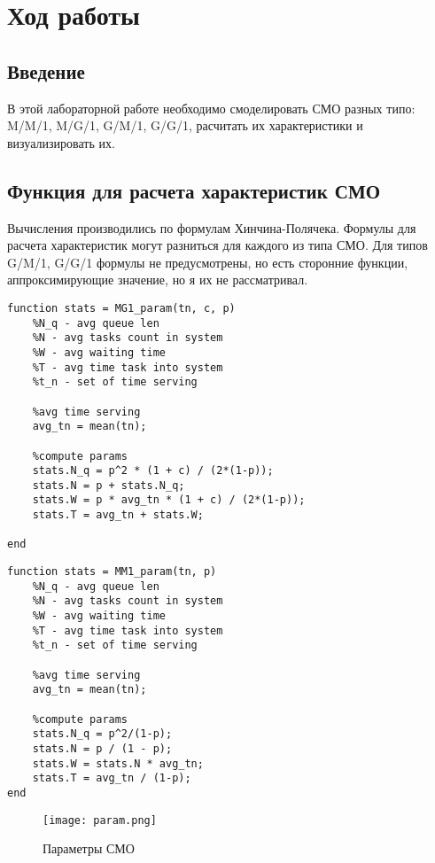 \chapter{Ход работы}
\label{ch:chap2}

\section*{\textbf{Введение}}

В этой лабораторной работе необходимо смоделировать СМО разных типо: M/M/1, M/G/1, G/M/1, G/G/1, расчитать их характеристики 
и визуализировать их.

\section*{\textbf{Функция для расчета характеристик СМО}}

Вычисления производились по формулам Хинчина-Полячека. Формулы для расчета характеристик могут разниться для каждого из типа СМО.
Для типов G/M/1, G/G/1 формулы не предусмотрены, но есть сторонние функции, аппроксимирующие значение, но я их не рассматривал.

\begin{lstlisting}
function stats = MG1_param(tn, c, p)
    %N_q - avg queue len
    %N - avg tasks count in system
    %W - avg waiting time 
    %T - avg time task into system
    %t_n - set of time serving

    %avg time serving
    avg_tn = mean(tn);

    %compute params
    stats.N_q = p^2 * (1 + c) / (2*(1-p));
    stats.N = p + stats.N_q;
    stats.W = p * avg_tn * (1 + c) / (2*(1-p));
    stats.T = avg_tn + stats.W;

end
\end{lstlisting}

\begin{lstlisting}
function stats = MM1_param(tn, p)
    %N_q - avg queue len
    %N - avg tasks count in system
    %W - avg waiting time 
    %T - avg time task into system
    %t_n - set of time serving

    %avg time serving
    avg_tn = mean(tn);

    %compute params
    stats.N_q = p^2/(1-p);
    stats.N = p / (1 - p);
    stats.W = stats.N * avg_tn;
    stats.T = avg_tn / (1-p);
end
\end{lstlisting}

\begin{figure}[H]
    \centering
    \texttt{[image: param.png]}
    \caption{Параметры СМО}
\end{figure}

